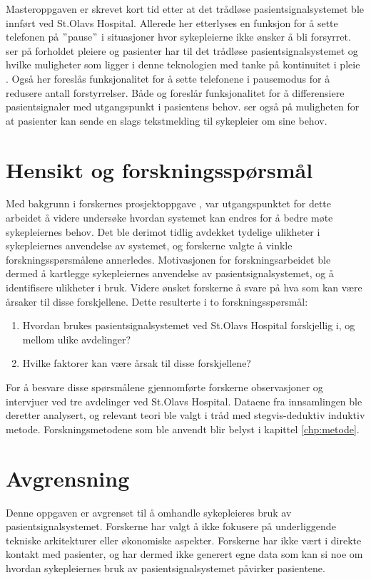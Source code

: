 \noindent
Masteroppgaven \citep{Sletten09} er skrevet kort tid etter at det trådløse pasientsignalsystemet ble innført ved St.Olavs Hospital. Allerede her etterlyses en funksjon for å sette telefonen på $"$pause$"$ i situasjoner hvor sykepleierne ikke ønsker å bli forsyrret. \citet{Rygh13} ser på forholdet pleiere og pasienter har til det trådløse pasientsignalsystemet og hvilke muligheter som ligger i denne teknologien med tanke på kontinuitet i pleie . Også her foreslås funksjonalitet for å sette telefonene i pausemodus for å redusere antall forstyrrelser. Både \citep{Rygh13} og \citep{Selseth12} foreslår funksjonalitet for å differensiere pasientsignaler med utgangspunkt i pasientens behov. \citet{Selseth12} ser også på muligheten for at pasienter kan sende en slags tekstmelding til sykepleier om sine behov.

\section{Hensikt og forskningsspørsmål}
Med bakgrunn i forskernes prosjektoppgave \citep{Sund13}, var utgangspunktet for dette arbeidet å videre undersøke hvordan systemet kan endres for å bedre møte sykepleiernes behov. Det ble derimot tidlig avdekket tydelige ulikheter i sykepleiernes anvendelse av systemet, og forskerne valgte å vinkle forskningsspørsmålene annerledes. Motivasjonen for forskningsarbeidet ble dermed å kartlegge sykepleiernes anvendelse av pasientsignalsystemet, og å identifisere ulikheter i bruk. Videre ønsket forskerne å svare på hva som kan være årsaker til disse forskjellene. Dette resulterte i to forskningsspørsmål:

\begin{enumerate}
\item Hvordan brukes pasientsignalsystemet ved St.Olavs Hospital forskjellig i, og mellom ulike avdelinger? 
\item Hvilke faktorer kan være årsak til disse forskjellene?
\end{enumerate}

\noindent
For å besvare disse spørsmålene gjennomførte forskerne observasjoner og intervjuer ved tre avdelinger ved St.Olavs Hospital. Dataene fra innsamlingen ble deretter analysert, og relevant teori ble valgt i tråd med stegvis-deduktiv induktiv metode. Forskningsmetodene som ble anvendt blir belyst i kapittel \ref{chp:metode}.

\section{Avgrensning}
Denne oppgaven er avgrenset til å omhandle sykepleieres bruk av pasientsignalsystemet. Forskerne har valgt å ikke fokusere på underliggende tekniske arkitekturer eller økonomiske aspekter. Forskerne har ikke vært i direkte kontakt med pasienter, og har dermed ikke generert egne data som kan si noe om hvordan sykepleiernes bruk av pasientsignalsystemet påvirker pasientene. 

